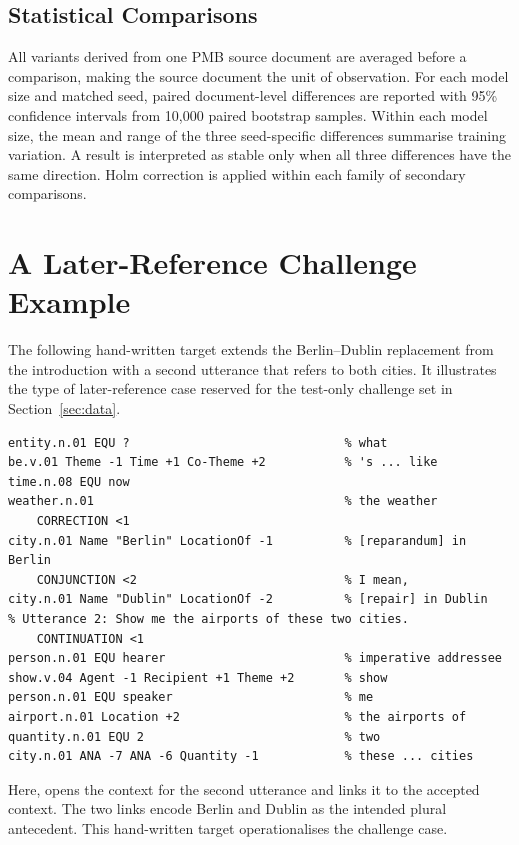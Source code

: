 \documentclass{article}
\begin{document}
\subsection{Statistical Comparisons}
\label{app:model-statistics}

All variants derived from one PMB source document are averaged before a
comparison, making the source document the unit of observation. For each model
size and matched seed, paired document-level differences are reported with
95\% confidence intervals from 10,000 paired bootstrap samples. Within each
model size, the mean and range of the three seed-specific differences
summarise training variation. A result is interpreted as stable only when all
three differences have the same direction. Holm correction is applied within
each family of secondary comparisons.

\section{A Later-Reference Challenge Example}
\label{app:later-reference}

The following hand-written target extends the Berlin--Dublin replacement from
the introduction with a second utterance that refers to both cities. It
illustrates the type of later-reference case reserved for the test-only
challenge set in Section~\ref{sec:data}.

\begin{lstlisting}[style=sbn]
% Utterance 1: What's the weather like in Berlin, I mean, in Dublin?
entity.n.01 EQU ?                              % what
be.v.01 Theme -1 Time +1 Co-Theme +2           % 's ... like
time.n.08 EQU now
weather.n.01                                   % the weather
    CORRECTION <1
city.n.01 Name "Berlin" LocationOf -1          % [reparandum] in Berlin
    CONJUNCTION <2                             % I mean,
city.n.01 Name "Dublin" LocationOf -2          % [repair] in Dublin
% Utterance 2: Show me the airports of these two cities.
    CONTINUATION <1
person.n.01 EQU hearer                         % imperative addressee
show.v.04 Agent -1 Recipient +1 Theme +2       % show
person.n.01 EQU speaker                        % me
airport.n.01 Location +2                       % the airports of
quantity.n.01 EQU 2                            % two
city.n.01 ANA -7 ANA -6 Quantity -1            % these ... cities
\end{lstlisting}

Here,  opens the context for the second
utterance and links it to the accepted context. The two
 links encode Berlin and Dublin as the intended plural
antecedent. This hand-written target operationalises the challenge case.
\end{document}
